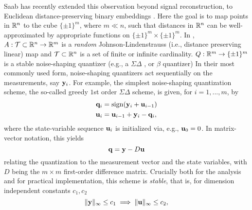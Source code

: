 Saab has recently  extended this observation beyond signal reconstruction, to Euclidean distance-preserving binary embeddings \cite{huynh2018fast}. Here the goal is to map points in $\mathbb{R}^n$ to the cube $\{\pm 1\}^m$, where $m\ll n$, such that  distances in $\mathbb{R}^n$ can be well-approximated by appropriate functions on $\{\pm 1\}^m \times \{\pm 1\}^m$. %
In \cite{huynh2018fast},  $A: \mathcal{T}\subset\mathbb{R}^n \to \mathbb{R}^m$ is a \emph{random} Johnson-Lindenstrauss \cite{johnson1984extensions} (i.e., distance preserving linear) map and  $\mathcal{T}\subset \mathbb{R}^n$ is a set of finite or infinite cardinality. $Q:\mathbb{R}^m \to \{\pm 1\}^m$ is a stable noise-shaping quantizer (e.g., a $\Sigma\Delta$ \cite{daubechies2003approximating}, or $\beta$ \cite{chou2016distributed} quantizer)
%
%
\iffalse In their most commonly used form, noise-shaping quantizers act sequentially on the measurements, say $\mathbf{y}_i$. 
For example, the simplest noise-shaping quantization scheme, the so-called greedy $1$st order $\Sigma\Delta$ scheme, is given, for $i=1,...,m$, by 
\begin{align}
    \mathbf{q}_i &= \mathrm{sign}(\mathbf{y}_i+\mathbf{u}_{i-1})\\
    \mathbf{u}_i &= \mathbf{u}_{i-1} + \mathbf{y}_i -\mathbf{q}_i,
\end{align}
where the state-variable sequence $\mathbf{u}_i$ is initialized via, e.g., $\mathbf{u}_0=0$. In matrix-vector notation, this yields  \begin{equation}\mathbf{q}=\mathbf{y} - D\mathbf{u}\label{eq:SD_state}\end{equation}  relating the quantization to the measurement vector and the state variables, with $D$ being the $m\times m$ first-order difference matrix. Crucially both for the analysis and for practical implementation, this scheme is \emph{stable}, that is, for dimension independent constants $c_1,c_2$
 \begin{equation}\|\mathbf{y}\|_\infty \leq c_1 \implies \|\mathbf{u}\|_\infty \leq c_2,\label{eq:stability}\end{equation}


